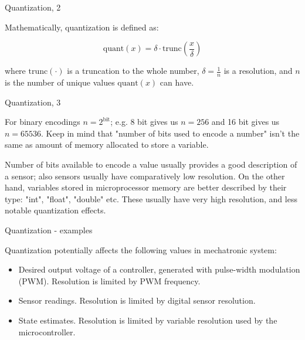\documentclass{beamer}
\begin{document}
\begin{frame}{Quantization, 2}
	\begin{flushleft}
		
		Mathematically, quantization is defined as:
		
		\begin{equation}
			\text{quant}(x) = \delta \cdot \text{trunc}\left(  \frac{x}{\delta} \right)
		\end{equation}
		
		where $\text{trunc}(\cdot)$ is a truncation to the whole number, $\delta = \frac{1}{n}$ is a resolution, and $n$ is the number of unique values $\text{quant}(x)$ can have. 
		
		
	\end{flushleft}
\end{frame}


\begin{frame}{Quantization, 3}
	\begin{flushleft}
		
		
		For binary encodings $n = 2^{\text{bit}}$; e.g. 8 bit gives us $n=256$ and 16 bit gives us $n= 65536$. Keep in mind that "number of bits used to encode a number" isn't the same as amount of memory allocated to store a variable. 
		
		\bigskip
		
		Number of bits available to encode a value usually provides a good description of a sensor; also sensors usually have comparatively low resolution. On the other hand, variables stored in microprocessor memory are better described by their type: "int", "float", "double" etc. These usually have very high resolution, and less notable quantization effects. 
		
	\end{flushleft}
\end{frame}



\begin{frame}{Quantization - examples}
	\begin{flushleft}
		
		Quantization potentially affects the following values in mechatronic system:
		
		\begin{itemize}
			\item Desired output voltage of a controller, generated with pulse-width modulation (PWM). Resolution is limited by PWM frequency.
			
			\item Sensor readings. Resolution is limited by digital sensor resolution.
			
			\item State estimates. Resolution is limited by variable resolution used by the microcontroller.
		\end{itemize}
		
	\end{flushleft}
\end{frame}
\end{document}

